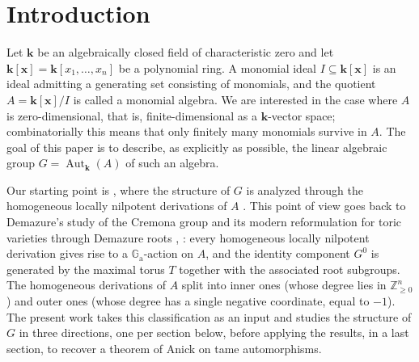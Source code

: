 \documentclass[11pt,letterpaper,reqno]{amsart}
\theoremstyle{remark}
\theoremstyle{definition}
\def\XX{\mathbf{x}}
\newcommand{\KK}[0]{\ensuremath{\mathbf{k}}}
\newcommand{\ZZ}[0]{\ensuremath{\mathbb{Z}}}
\newcommand{\GA}[0]{\ensuremath{\mathbb{G}_{\mathrm{a}}}}
\newcommand{\Aut}[0]{\ensuremath{\operatorname{Aut}}}
\begin{document}

\section*{Introduction}
Let $\KK$ be an algebraically closed field of characteristic zero and let
$\KK[\XX]=\KK[x_1,\dots,x_n]$ be a polynomial ring. A monomial ideal
$I\subseteq\KK[\XX]$ is an ideal admitting a generating set consisting of
monomials, and the quotient $A=\KK[\XX]/I$ is called a monomial algebra.
We are interested in the case where $A$ is zero-dimensional, that is,
finite-dimensional as a $\KK$-vector space; combinatorially this means that
only finitely many monomials survive in $A$. The goal of this paper is to describe, as explicitly as possible, the linear algebraic group $G=\Aut_\KK(A)$ of such an algebra.

Our starting point is \cite{DLMR24}, where the structure of $G$ is analyzed through the homogeneous locally nilpotent derivations of $A$ \cite[Theorem~4.21]{DLMR24}. This point of view goes back
to Demazure's study of the Cremona group \cite[Section~2, Th\'eor\`eme~2]{demazure1970sous} and its modern
reformulation for toric varieties through Demazure roots
\cite[Theorem~2.7]{liendo2010affine}, \cite[Thm.~2]{LL21}: every homogeneous locally nilpotent derivation gives rise to a $\GA$-action on $A$, and the identity component
$G^0$ is generated by the maximal torus $T$ together with the associated root
subgroups. The homogeneous derivations of $A$ split into inner ones (whose degree lies in $\ZZ^n_{\geq 0}$) and outer ones (whose degree has a single negative coordinate, equal to $-1$). The present work takes this classification as an
input and studies the structure of $G$ in three directions, one per section below,
before applying the results, in a last section, to recover a theorem of Anick on tame
automorphisms.
\end{document}
